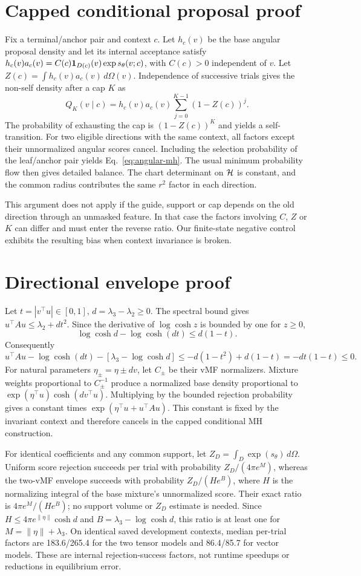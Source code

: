 \section{Capped conditional proposal proof}
Fix a terminal/anchor pair and context $c$. Let $h_c(v)$ be the base angular
proposal density and let its internal acceptance satisfy
$h_c(v)a_c(v)=C(c){\bf 1}_{D(c)}(v)\exp s_\theta(v;c)$, with $C(c)>0$ independent
of $v$. Let $Z(c)=\int h_c(v)a_c(v)\,d\Omega(v)$. Independence of successive trials
gives the non-self density after a cap $K$ as
\[
 Q_K(v\mid c)=h_c(v)a_c(v)\sum_{j=0}^{K-1}(1-Z(c))^j.
\]
The probability of exhausting the cap is $(1-Z(c))^K$ and yields a self-transition.
For two eligible directions with the same context, all factors except their
unnormalized angular scores cancel. Including the selection probability of the
leaf/anchor pair yields Eq.~\eqref{eq:angular-mh}. The usual minimum probability
flow then gives detailed balance. The chart determinant on $\mathcal H$ is constant,
and the common radius contributes the same $r^2$ factor in each direction.

This argument does not apply if the guide, support or cap depends on the old
direction through an unmasked feature. In that case the factors involving
$C$, $Z$ or $K$ can differ and must enter the reverse ratio. Our finite-state
negative control exhibits the resulting bias when context invariance is broken.

\section{Directional envelope proof}
Let $t=|v^\top u|\in[0,1]$, $d=\lambda_3-\lambda_2\ge 0$. The spectral bound gives
$u^\top A u\le\lambda_2+d t^2$. Since the derivative of $\log\cosh z$ is bounded
by one for $z\ge 0$,
\[
 \log\cosh d-\log\cosh(dt)\le d(1-t).
\]
Consequently
\[
 u^\top A u-\log\cosh(dt)-[\lambda_3-\log\cosh d]
 \le-d(1-t^2)+d(1-t)=-dt(1-t)\le 0.
\]
For natural parameters $\eta_\pm=\eta\pm dv$, let $C_\pm$ be their vMF normalizers.
Mixture weights proportional to $C_\pm^{-1}$ produce a normalized base density
proportional to $\exp(\eta^\top u)\cosh(dv^\top u)$. Multiplying by the bounded
rejection probability gives a constant times $\exp(\eta^\top u+u^\top A u)$.
This constant is fixed by the invariant context and therefore cancels in the
capped conditional MH construction.

For identical coefficients and any common support, let $Z_D=\int_D\exp(s_\theta)
\,d\Omega$. Uniform score rejection succeeds per trial with probability
$Z_D/(4\pi e^M)$, whereas the two-vMF envelope succeeds with probability
$Z_D/(H e^B)$, where $H$ is the normalizing integral of the base mixture's
unnormalized score. Their exact ratio is $4\pi e^M/(H e^B)$; no support volume
or $Z_D$ estimate is needed. Since
$H\le 4\pi e^{\|\eta\|}\cosh d$ and $B=\lambda_3-\log\cosh d$, this ratio
is at least one for $M=\|\eta\|+\lambda_3$.
On identical saved development contexts, median per-trial factors are 183.6/265.4
for the two tensor models and 86.4/85.7 for vector models. These are internal
rejection-success factors, not runtime speedups or reductions in equilibrium error.

